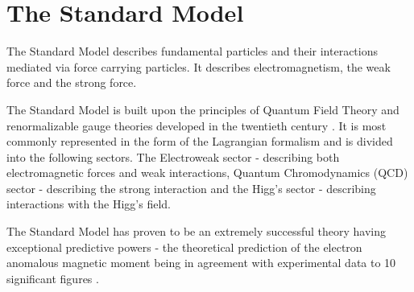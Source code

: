 \section{The Standard Model}


The Standard Model %
describes fundamental particles and their interactions mediated via force carrying particles. It describes electromagnetism, the weak force and the strong force. 


The Standard Model is built upon the principles of Quantum Field Theory and renormalizable gauge theories developed in the twentieth century \cite{Griffiths:Introduction-to-elementary-particles}. It is most commonly represented in the form of the Lagrangian formalism and is divided into the following sectors. The Electroweak sector - describing both electromagnetic forces and weak interactions, Quantum Chromodynamics (QCD) sector - describing the strong interaction and the Higg's sector - describing interactions with the Higg's field.

The Standard Model has proven to be an extremely successful theory having exceptional predictive powers - the theoretical prediction of the electron anomalous magnetic moment being in agreement with experimental data to 10 significant figures \cite{PhysRevLett.97.030801}. 


